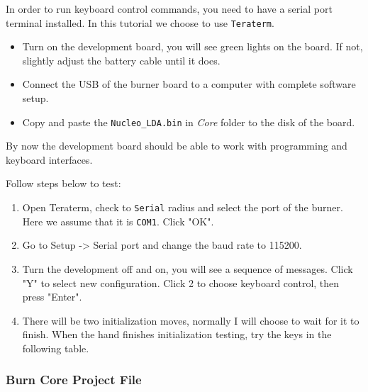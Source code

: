 \documentclass[11pt]{article}
\begin{document}
In order to run keyboard control commands, you need to have a serial port terminal installed. In this tutorial we choose to use \texttt{Teraterm}. 

\begin{itemize}
\item Turn on the development board, you will see green lights on the board. If not, slightly adjust the battery cable until it does.
\item Connect the USB of the burner board to a computer with complete software setup.
\item Copy and paste the \texttt{Nucleo\_LDA.bin} in \emph{Core} folder to the disk of the board.
\end{itemize}

By now the development board should be able to work with programming and keyboard interfaces. 

Follow steps below to test:
\begin{enumerate}
\item Open Teraterm, check to \texttt{Serial} radius and select the port of the burner. Here we assume that it is \texttt{COM1}. Click "OK".
\item Go to Setup -> Serial port and change the baud rate to 115200.
\item Turn the development off and on, you will see a sequence of messages. Click "Y" to select new configuration. Click 2 to choose keyboard control, then press "Enter".
\item There will be two initialization moves, normally I will choose to wait for it to finish. When the hand finishes initialization testing, try the keys in the following table.
\end{enumerate}



\subsubsection{Burn Core Project File}
\label{sec:orgheadline2}
\end{document}
